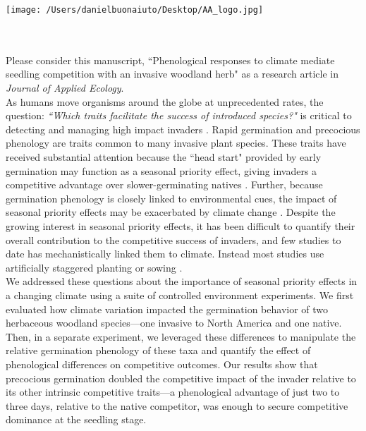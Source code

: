 \documentclass[11.5 pt]{article}
\begin{document}


\def\labelitemi{--}
\parindent=24pt
\noindent\texttt{[image: /Users/danielbuonaiuto/Desktop/AA\_logo.jpg]}
\\\\
\\
\vspace{1.5ex}

\noindent Please consider this manuscript, ``Phenological responses to climate mediate seedling competition with
an invasive woodland herb" as a research article in \textit{Journal of Applied Ecology}.\\

\noindent As humans move organisms around the globe at unprecedented rates, the question:  \textit{``Which traits facilitate the success of introduced species?"} is critical to detecting and managing high impact invaders \citep{Fournier2019}. 
Rapid germination and precocious phenology are traits common to many invasive plant species. These traits have received substantial attention because the ``head start" provided by early germination may function as a seasonal priority effect, giving invaders a competitive advantage over slower-germinating natives \citep{Wainwright_2011}. Further, because germination phenology is closely linked to environmental cues, the impact of seasonal priority effects may be exacerbated by climate change \citep{Rudolf:2019aa}. Despite the growing interest in seasonal priority effects, it has been difficult to quantify their overall contribution to the competitive success of invaders, and few studies to date has mechanistically linked them to climate. Instead most studies use artificially staggered planting or sowing \citep{Young:2017aa}.\\

\noindent We addressed these questions about the importance of seasonal priority effects in a changing climate using a suite of controlled environment experiments. We first evaluated how climate variation impacted the germination behavior of two herbaceous woodland species---one invasive to North America and one native. Then, in a separate experiment, we leveraged these differences to manipulate the relative germination phenology of these taxa and quantify the effect of phenological differences on competitive outcomes. Our results show that precocious germination doubled the competitive impact of the invader relative to its other intrinsic competitive traits---a phenological advantage of just two to three days, relative to the native competitor, was enough to secure competitive dominance at the seedling stage.\\
\end{document}

